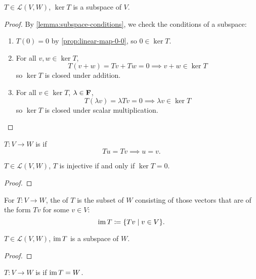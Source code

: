\begin{proposition}
$T\in\mathcal{L}(V,W)$, $\ker T$ is a subspace of $V$.
\end{proposition}

\begin{proof}
By \cref{lemma:subspace-conditions}, we check the conditions of a subspace:
\begin{enumerate}[label=(\roman*)]
\item $T(0)=0$ by \cref{prop:linear-map-0-0}, so $0\in\ker T$.
\item For all $v,w\in\ker T$, 
\[T(v+w)=Tv+Tw=0\implies v+w\in\ker T\]
so $\ker T$ is closed under addition.
\item For all $v\in\ker T$, $\lambda\in\mathbf F$,
\[T(\lambda v)=\lambda Tv=0\implies\lambda v\in\ker T\]
so $\ker T$ is closed under scalar multiplication.
\end{enumerate}
\end{proof}

\begin{definition}[Injectivity]
$T:V\to W$ is  if
\[Tu=Tv\implies u=v.\]
\end{definition}

\begin{proposition}
$T\in\mathcal{L}(V,W)$, $T$ is injective if and only if $\ker T=0$.
\end{proposition}

\begin{proof}

\end{proof}

\begin{definition}[Image]
For $T:V\to W$, the  of $T$ is the subset of $W$ consisting of those vectors that are of the form $Tv$ for some $v\in V$:
\[\operatorname{im} T\coloneqq\{Tv\mid v\in V\}.\]
\end{definition}

\begin{proposition}
$T\in\mathcal{L}(V,W)$, $\operatorname{im} T$ is a subspace of $W$.
\end{proposition}

\begin{proof}

\end{proof}

\begin{definition}[Surjectivity]
$T:V\to W$ is  if $\operatorname{im} T=W$.
\end{definition}

